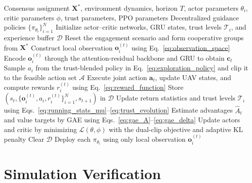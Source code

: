 \documentclass[lettersize,journal]{IEEEtran}
\begin{document}
\begin{algorithm}[!t]
\caption{ART-MAPPO Cooperative Interception Guidance}
\label{alg:artmappo}
\footnotesize
\begin{algorithmic}[1]
\REQUIRE Consensus assignment $\mathbf{X}^{*}$, environment dynamics, horizon $T$, actor
parameters $\theta_i$, critic parameters $\phi$, trust parameters, PPO parameters
\ENSURE Decentralized guidance policies $\{\pi_{\theta_i}\}_{i=1}^{N}$
\STATE Initialize actor--critic networks, GRU states, trust levels $\mathcal{T}_i$, and
experience buffer $\mathcal{D}$
    \STATE Reset the engagement scenario and form cooperative groups from $\mathbf{X}^{*}$
            \STATE Construct local observation $\mathbf{o}_i^{(t)}$ using
            Eq.~\eqref{eq:observation_space}
            \STATE Encode $\mathbf{o}_i^{(t)}$ through the attention-residual backbone and
            GRU to obtain $\mathbf{c}_t$
            \STATE Sample $a_i$ from the trust-blended policy in Eq.~\eqref{eq:exploration_policy}
            and clip it to the feasible action set $\mathcal{A}$
        \ENDFOR
        \STATE Execute joint action $\mathbf{a}_t$, update UAV states, and compute rewards
        $r_i^{(t)}$ using Eq.~\eqref{eq:reward_function}
        \STATE Store $(s_t,\{\mathbf{o}_i^{(t)},a_i,r_i^{(t)}\}_{i=1}^{N},s_{t+1})$ in
        $\mathcal{D}$
    \ENDFOR
    \STATE Update return statistics and trust levels $\mathcal{T}_i$ using
    Eqs.~\eqref{eq:running_stats_mu}--\eqref{eq:trust_evolution}
    \STATE Estimate advantages $\hat{A}_t$ and value targets by GAE using
    Eqs.~\eqref{eq:gae_A}--\eqref{eq:gae_delta}
    \STATE Update actors and critic by minimizing $\mathcal{L}(\theta,\phi)$ with the
    dual-clip objective and adaptive KL penalty
    \STATE Clear $\mathcal{D}$
\ENDFOR
\STATE Deploy each $\pi_{\theta_i}$ using only local observation $\mathbf{o}_i^{(t)}$
\end{algorithmic}
\end{algorithm}










\section{Simulation Verification}
\label{sec:simulation}
\end{document}

